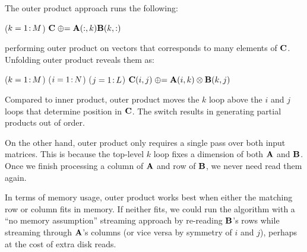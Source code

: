 The outer product approach runs the following:

\removelatexerror
\begin{algorithm}[H]
\vspace{\algspace}
\fore($k = 1\colon\! M$){
{$\mathbf{C} \mathrel{\oplus}= \mathbf{A}(:,k) \mathbf{B}(k,:)$}
}
\vspace{\algspace}
\end{algorithm}

\noindent %
performing outer %
product on vectors that corresponds to many elements of $\mathbf{C}$. %
Unfolding outer product reveals them %
as:

\removelatexerror
\begin{algorithm}[H]
\vspace{\algspace}
\fore($k = 1\colon\! M$){
\fore($i = 1\colon\! N$){
\fore($j = 1\colon\! L$){
{$\mathbf{C}(i,j) \mathrel{\oplus}=  \mathbf{A}(i,k) \otimes \mathbf{B}(k,j)$}
}}}
\vspace{\algspace}
\end{algorithm}

Compared to inner product, outer product moves the $k$ loop
above the $i$ and $j$ loops that determine position in $\mathbf{C}$.
The switch results in generating partial products out of order.


On the other hand, outer product only requires a single pass over both input matrices.
This is because the top-level $k$ loop fixes a dimension of both $\mathbf{A}$ and $\mathbf{B}$.
Once we finish processing a column of $\mathbf{A}$ and row of $\mathbf{B}$,
we never need read them again.%

In terms of memory usage, outer product works best when either the matching row or column fits in memory.
If neither fits, we could run the algorithm 
with a ``no memory assumption'' streaming approach
by re-reading $\mathbf{B}$'s rows while streaming through $\mathbf{A}$'s columns 
(or vice versa by symmetry of $i$ and $j$),
perhaps at the cost of extra disk reads.

